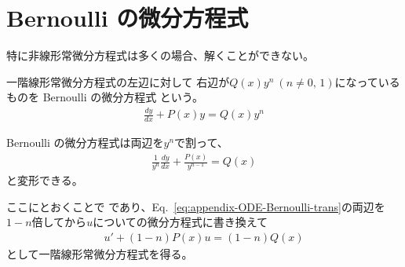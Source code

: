 \section{Bernoulli の微分方程式}
特に非線形常微分方程式は多くの場合、解くことができない。

一階線形常微分方程式の左辺に対して
右辺が$Q(x) y^n \: (n\neq 0,\,1)$になっているものを Bernoulli の微分方程式
という。
\begin{gather}
  \frac{dy}{dx} + P(x)y = Q(x)y^n \label{eq:appendix-ODE-Bernoulli}
\end{gather}

Bernoulli の微分方程式は両辺を$y^n$で割って、
\begin{gather}
  \frac{1}{y^n} \frac{dy}{dx} + \frac{P(x)}{y^{n-1}} = Q(x) \label{eq:appendix-ODE-Bernoulli-trans}
\end{gather}
と変形できる。

ここにとおくことで
であり、Eq.~\eqref{eq:appendix-ODE-Bernoulli-trans}の両辺を$1-n$倍してから$u$についての微分方程式に書き換えて
\begin{gather}
  u' + (1-n)P(x)u = (1-n)Q(x)
\end{gather}
として一階線形常微分方程式を得る。
